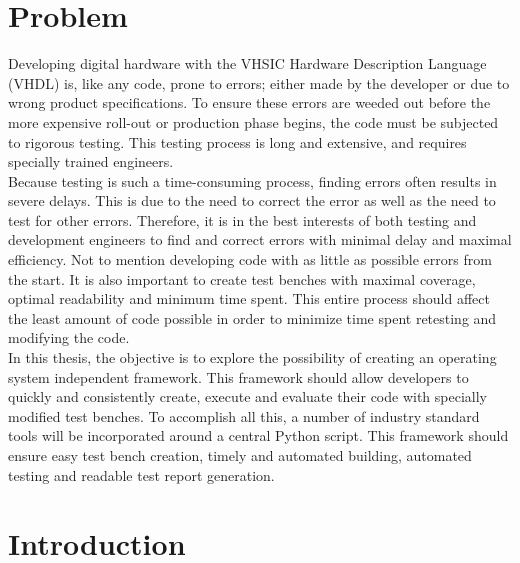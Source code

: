 \documentclass[11pt,british]{article}
\begin{document}
\section{Problem}
Developing digital hardware with the \gls{VHSIC} Hardware Description Language (\gls{VHDL}) is, like any code, prone to errors; either made by the developer or due to wrong product specifications. To ensure these errors are weeded out before the more expensive roll-out or production phase begins, the code must be subjected to rigorous testing. This testing process is long and extensive, and requires specially trained engineers.
\\[\baselineskip]
Because testing is such a time-consuming process, finding errors often results in severe delays. This is due to the need to correct the error as well as the need to test for other errors. Therefore, it is in the best interests of both testing and development engineers to find and correct errors with minimal delay and maximal efficiency. Not to mention developing code with as little as possible errors from the start. It is also important to create test benches with maximal coverage, optimal readability and minimum time spent. This entire process should affect the least amount of code possible in order to minimize time spent retesting and modifying the code.
\\[\baselineskip]
In this thesis, the objective is to explore the possibility of creating an operating system independent framework. This framework should allow developers to quickly and consistently create, execute and evaluate their code with specially modified test benches. To accomplish all  this, a number of industry standard tools will be incorporated around a central Python script. This framework should ensure easy test bench creation, timely and automated building, automated  testing and readable test report generation.




\newpage{}


\section{Introduction}
\label{sec:intro}
\end{document}
